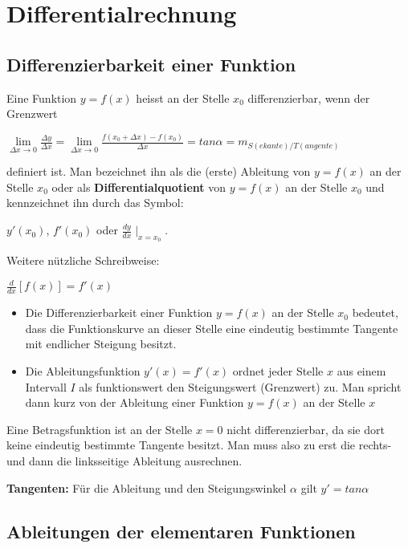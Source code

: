 \chapter{Differentialrechnung}
\section{Differenzierbarkeit einer Funktion}
Eine Funktion \(y=f(x)\) heisst an der Stelle \(x_0\) differenzierbar, wenn der Grenzwert

\( \lim\limits_{\Delta x \rightarrow 0}{\frac{\Delta y}{\Delta x}} = \lim\limits_{\Delta x \rightarrow 0}{\frac{f(x_0 + \Delta x)-f(x_0)}{\Delta x}} = tan \alpha = m_{S(ekante)/T(angente)} \)

definiert ist. Man bezeichnet ihn als die (erste) Ableitung von \(y=f(x)\) an der Stelle \(x_0\) oder als \textbf{Differentialquotient} von \(y=f(x)\) an der Stelle \(x_0\) und kennzeichnet ihn durch das Symbol:

 \hspace*{10mm}\(y'(x_0)\), \(f'(x_0)\) oder \(\frac{dy}{dx} \mid_{x=x_0}\).

Weitere nützliche Schreibweise:

\hspace*{10mm}\(\frac{d}{dx}[f(x)] = f'(x)\)

\begin{itemize}
	\item Die Differenzierbarkeit einer Funktion \(y=f(x)\) an der Stelle \(x_0\) bedeutet, dass die Funktionskurve an dieser Stelle eine eindeutig bestimmte Tangente mit endlicher Steigung besitzt.
	\item Die Ableitungsfunktion \(y'(x)=f'(x)\) ordnet jeder Stelle \(x\) aus einem Intervall \(I\) als funktionswert den Steigungswert (Grenzwert) zu. Man spricht dann kurz von der Ableitung einer Funktion \(y=f(x)\) an der Stelle \(x\)
\end{itemize}
Eine Betragsfunktion ist an der Stelle \(x=0\) nicht differenzierbar, da sie dort keine eindeutig bestimmte Tangente besitzt. Man muss also zu erst die rechts- und dann die linksseitige Ableitung ausrechnen.
\par \textbf{Tangenten:} Für die Ableitung und den Steigungswinkel \(\alpha\) gilt \(y'=tan \alpha\)

\section{Ableitungen der elementaren Funktionen}

